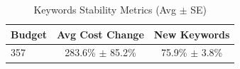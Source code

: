 \begin{table}[htbp]
\centering
\caption{Keywords Stability Metrics (Avg $\pm$ SE)}
\begin{tabular}{lcc}
\toprule
Budget & Avg Cost Change & New Keywords \\
\midrule
357 & 283.6\% $\pm$ 85.2\% & 75.9\% $\pm$ 3.8\% \\
\bottomrule
\end{tabular}
\end{table}